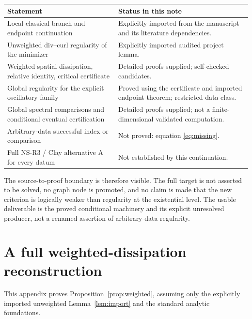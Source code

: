 \documentclass[11pt,a4paper]{article}
\theoremstyle{definition}\newtheorem{definition}[theorem]{Definition}
\theoremstyle{remark}\newtheorem{remark}[theorem]{Remark}
\numberwithin{equation}{section}
\begin{document}
\begin{center}
\begin{tabular}{@{}>{\raggedright\arraybackslash}p{91mm}>{\raggedright\arraybackslash}p{63mm}@{}}\toprule
Statement & Status in this note\\\midrule
Local classical branch and endpoint continuation & Explicitly imported from the manuscript and its literature dependencies.\\[3pt]
Unweighted div--curl regularity of the minimizer & Explicitly imported audited project lemma.\\[3pt]
Weighted spatial dissipation, relative identity, critical certificate & Detailed proofs supplied; self-checked candidates.\\[3pt]
Global regularity for the explicit oscillatory family & Proved using the certificate and imported endpoint theorem; restricted data class.\\[3pt]
Global spectral comparisons and conditional eventual certification & Detailed proofs supplied; not a finite-dimensional validated computation.\\[3pt]
Arbitrary-data successful index or comparison & Not proved: equation \eqref{eq:missing}.\\[3pt]
Full NS-R3 / Clay alternative A for every datum & Not established by this continuation.\\\bottomrule
\end{tabular}
\end{center}
The source-to-proof boundary is therefore visible. The full target is not asserted to be solved, no graph node is promoted, and no claim is made that the new criterion is logically weaker than regularity at the existential level. The usable deliverable is the proved conditional machinery and its explicit unresolved producer, not a renamed assertion of arbitrary-data regularity.

\appendix
\section{A full weighted-dissipation reconstruction}
\label{app:weighted}
This appendix proves Proposition~\ref{prop:weighted}, assuming only the explicitly imported unweighted Lemma~\ref{lem:import} and the standard analytic foundations.
\end{document}
